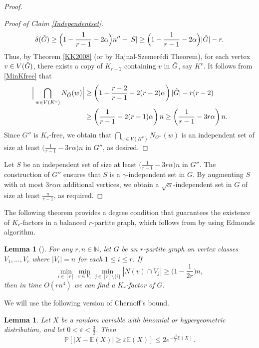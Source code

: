 \documentclass[11pt, a4paper]{article}
\newtheorem{lemma}[theorem]{Lemma}
\theoremstyle{definition}
\newcommand{\eps}{\varepsilon}
\newcommand{\<}{\subseteq}
\begin{document}
\begin{proof}
\begin{proof}[Proof of Claim \ref{Independentset}]
\begin{align}
\delta(\Tilde{G})\ge \Big(1-\frac{1}{r-1}-2\alpha\Big)n''-|S|\ge \Big(1-\frac{1}{r-1}-2\alpha\Big)|\Tilde{G}|-r.
\end{align} 
Thus, by Theorem \ref{KK2008} (or by  Hajnal-Szemer\'{e}di Theorem), for each vertex $v\in V(\Tilde{G})$, there exists a copy of $K_{r-2}$  containing $v$ in $\Tilde{G}$, say $K^v$. %
It follows from \eqref{MinKfree} that 
\begin{align*}
\Big|\bigcap_{w\in V(K^v)}N_{\Tilde{G}}(w)\Big|&\ge \left(1-\frac{r-2}{r-1}-2(r-2)\alpha\right)|\Tilde{G}|-r(r-2)\\
&\ge \left(\frac{1}{r-1}-2(r-1) \alpha\right)n\ge \left(\frac{1}{r-1}-3r \alpha\right)n.
\end{align*}
Since $G''$ is $K_r$-free, we obtain that $\bigcap_{w\in V(K^v)}N_{G''}(w)$ is an independent set of size at least  $\big(\frac{1}{r-1}-3r \alpha\big)n$ in $G''$, as desired.
    \end{proof}
    
    
    
    
    Let $S$ be an independent set of size at least 
$\big(\frac{1}{r-1}-3r \alpha\big)n$ in $G''$. 
The construction of $G''$ ensures that $S$ is a $\gamma$-independent set in $G$. By augmenting $S$ with at most $3r\alpha n$ additional vertices, we obtain a $\sqrt{\alpha}$-independent set in $G$ of size at least $\frac{n}{r-1}$, as required.
\end{proof}


The following theorem provides a degree condition that guarantees the existence of $K_r$-factors in a balanced $r$-partite graph, which follows from \cite[Lemma 6.3]{GHH2024} by using Edmonds algorithm. 
\begin{lemma}[\cite{GHH2024}]\label{GHH2024} 
For any $r,n\in \mathbb{N}$, let $G$ be an $r$-partite graph on vertex classes $V_1,\ldots,V_r$ where $|V_i|=n$ for each $1\le i\le r$. If  
$$
\min_{i\in [r]}\min_{v\in V_i}\min_{j\in [r]\setminus \{i\}} |N(v)\cap V_j|\geq \Big(1-\frac{1}{2r}\Big)n,
$$
then in time $O(rn^4)$ we can find a $K_r$-factor of $G$.
\end{lemma}

We will use the following version of Chernoff's bound.
\begin{lemma}\label{chernoff}
    Let $X$ be a random variable with binomial or hypergeometric distribution, and let $0<\eps<\frac{3}{2}$. Then 
    $$
    \mathbb{P}[|X-\mathbb{E}(X)|\geq \eps \mathbb{E}(X)]\leq 2e^{-\frac{\eps^2}{3}\mathbb{E}(X)}.
      $$
\end{lemma}
\end{document}
